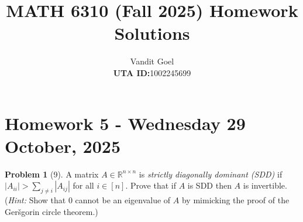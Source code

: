 \documentclass{amsart}[11pt]
\title{MATH 6310 (Fall 2025) Homework Solutions}
\author{Vandit Goel\\\textbf{UTA ID:}1002245699\\}
\theoremstyle{definition}
\newtheorem*{problem}{Problem}
\newcommand{\R}{\mathbb{R}}
\begin{document}
\maketitle

\section{Homework 5 - Wednesday  29 October, 2025}

\begin{problem}[9]
A matrix $A\in\R^{n\times n}$ is \textit{strictly diagonally dominant (SDD)} if $|A_{ii}|>\sum_{j\neq i}|A_{ij}|$ for all $i\in[n]$. Prove that if $A$ is SDD then $A$ is invertible. (\textit{Hint:} Show that $0$ cannot be an eigenvalue of $A$ by mimicking the proof of the Ger\v{s}gorin circle theorem.)
\end{problem}
\end{document}
